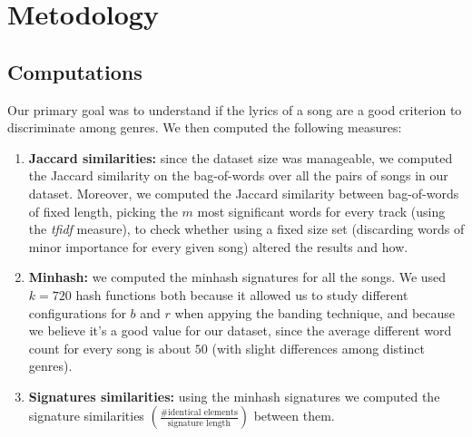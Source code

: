 \documentclass[a4paper, 11pt]{article} %
\begin{document}
\section{Metodology}
\subsection*{Computations} Our primary goal was to understand if the lyrics of a song are a good criterion to discriminate among genres. We then computed the following measures:
\begin{enumerate}
	\item \textbf{Jaccard similarities: } since the dataset size was manageable, we computed the Jaccard similarity on the bag-of-words over all the pairs of songs in our dataset. Moreover, we computed the Jaccard similarity between bag-of-words of fixed length, picking the $m$ most significant words for every track (using the \textit{tfidf} measure), to check whether using a fixed size set (discarding words of minor importance for every given song) altered the results and how.
	\item \textbf{Minhash: } we computed the minhash signatures for all the songs. We used $k = 720$ hash functions both because it allowed us to study different configurations for $b$ and $r$ when appying the banding technique, and because we believe it's a good value for our dataset, since the average different word count for every song is about $50$ (with slight differences among distinct genres).
	\item \textbf{Signatures similarities: } using the minhash signatures we computed the signature similarities $\left(\frac{\text{\# identical elements}}{\text{signature length}}\right)$ between them.
\end{enumerate}
\end{document}

